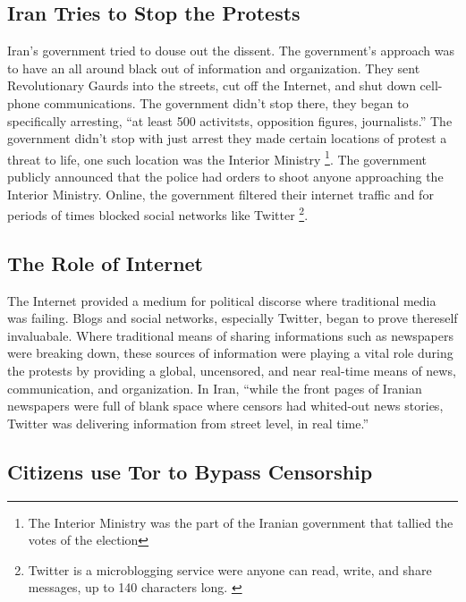 \documentclass[11pt]{article}
\begin{document}
\begin{multicols}{2}
\subsection{Iran Tries to Stop the Protests}

Iran's government tried to douse out the dissent. The government's approach was
to have an all around black out of information and organization. They sent
Revolutionary Gaurds into the streets, cut off the Internet, and shut down
cell-phone communications. \cite{TheIranianVote} The government didn't stop
there, they began to specifically arresting, ``at least 500 activitsts,
opposition figures, journalists.'' \cite{IranProtestsFifthDayOfUnrest} The
government didn't stop with just arrest they made certain locations of protest a
threat to life, one such location was the Interior Ministry \footnote{The
Interior Ministry was the part of the Iranian government that tallied the votes
of the election}. The government publicly announced that the police had orders
to shoot anyone approaching the Interior Ministry. \cite{TheIranianVote} Online,
the government filtered their internet traffic and for periods of times blocked
social networks like Twitter \footnote{Twitter is a microblogging service were
anyone can read, write, and share messages, up to 140 characters long.
\cite{WhatIsTwitter}}. \cite{IranBlocksFacebookTwitter}

\subsection{The Role of Internet}

The Internet provided a medium for political discorse where traditional media
was failing. Blogs and social networks, especially Twitter, began to prove
thereself invaluabale.  Where traditional means of sharing informations such as
newspapers were breaking down, these sources of information were playing a vital
role during the protests by providing a global, uncensored, and near real-time
means of news, communication, and organization.  In Iran, ``while the front
pages of Iranian newspapers were full of blank space where censors had
whited-out news stories, Twitter was delivering information from street level,
in real time.'' \cite{WhyTwitterIsTheMedium}

\subsection{Citizens use Tor to Bypass Censorship}


\end{multicols}
\end{document}
